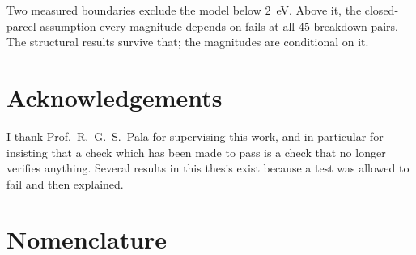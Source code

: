 \documentclass[12pt,a4paper,oneside]{report}
\begin{document}
Two measured boundaries exclude the model below \SI{2}{\electronvolt}. Above
it, the closed-parcel assumption every magnitude depends on fails at all $45$
breakdown pairs. The structural results survive that; the magnitudes are conditional on it.

\chapter*{Acknowledgements}

I thank Prof.\ R.\ G.\ S.\ Pala for supervising this work, and in particular for
insisting that a check which has been made to pass is a check that no longer
verifies anything. Several results in this thesis exist because a test was
allowed to fail and then explained.

\tableofcontents
\listoffigures
\listoftables

\chapter*{Nomenclature}
\end{document}
